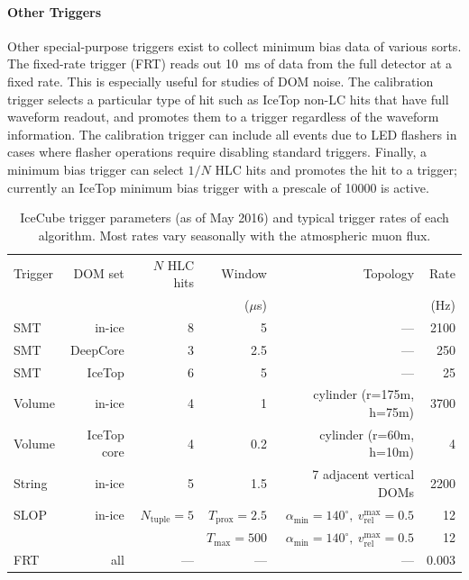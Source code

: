 \paragraph{Other Triggers}

Other special-purpose triggers exist to collect minimum bias data of
various sorts.  The fixed-rate trigger (FRT) reads out 10~ms of data
from the full detector at a fixed rate.  This is especially useful
for studies of DOM noise.  The calibration trigger
selects a particular type of hit such as IceTop 
non-LC hits that have full waveform readout, and promotes them to a
trigger regardless of the waveform information. The calibration
trigger can include all events due to LED flashers in cases
where flasher operations require disabling standard triggers. Finally, a minimum bias trigger
can select $1/N$ HLC hits and promotes the hit to a trigger; currently an
IceTop minimum bias trigger with a prescale of 10000 is active.

\begin{table}
  \centering
  \footnotesize
\begin{tabular}{lrrrrr}
  \hline
  Trigger & DOM set & $N$ HLC hits & Window & Topology & Rate\\
  & & & ($\mu$s) &  &  (Hz) \\
  \hline
  SMT & in-ice & 8 & 5 & --- & 2100\\
  SMT & DeepCore & 3 & 2.5 & --- & 250\\
  SMT & IceTop & 6 & 5 & --- & 25\\
  Volume & in-ice & 4 & 1 & cylinder (r=175m, h=75m) & 3700\\
  Volume & IceTop core & 4 & 0.2 & cylinder (r=60m, h=10m) & 4\\  
  String & in-ice & 5 & 1.5 & 7 adjacent vertical DOMs & 2200\\
  SLOP & in-ice & $N_{\mathrm{tuple}} = 5$ & $T_{\mathrm{prox}} = 2.5$ & $\alpha_{\mathrm{min}} =
  140^\circ,\ v_{\mathrm{rel}}^{\mathrm{max}} = 0.5$ & 12\\
   &  &  & $T_{\mathrm{max}} = 500$ & $\alpha_{\mathrm{min}} =
  140^\circ,\ v_{\mathrm{rel}}^{\mathrm{max}} = 0.5$ & 12\\
  FRT & all & --- & --- & --- & 0.003\\
\hline
\end{tabular}
\caption{IceCube trigger parameters (as of May 2016) and typical trigger rates of
  each algorithm.  Most rates vary seasonally with the atmospheric muon flux.} 
\label{tab:triggers}
\end{table}

